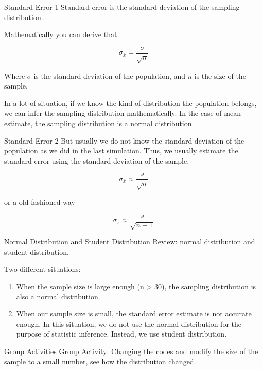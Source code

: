 \documentclass[
  ignorenonframetext,
]{beamer}
\begin{document}
\begin{frame}{Standard Error 1}
\protect\hypertarget{standard-error-1}{}
Standard error is the standard deviation of the sampling distribution.

Mathematically you can derive that

\[\sigma_{\bar{x}} =  \frac{\sigma}{\sqrt{n}}\]

Where \(\sigma\) is the standard deviation of the population, and \(n\)
is the size of the sample.

In a lot of situation, if we know the kind of distribution the
population belongs, we can infer the sampling distribution
mathematically. In the case of mean estimate, the sampling distribution
is a normal distribution.
\end{frame}

\begin{frame}{Standard Error 2}
\protect\hypertarget{standard-error-2}{}
But usually we do not know the standard deviation of the population as
we did in the last simulation. Thus, we usually estimate the standard
error using the standard deviation of the sample.

\[\sigma_{\bar{x}} \approx \frac{s}{\sqrt{n}}\]

or a old fashioned way

\[\sigma_{\bar{x}} \approx \frac{s}{\sqrt{n-1}}\]
\end{frame}

\begin{frame}{Normal Distribution and Student Distribution}
\protect\hypertarget{normal-distribution-and-student-distribution}{}
Review: normal distribution and student distribution.

Two different situations:

\begin{enumerate}
[1)]
\item
  When the sample size is large enough (n \textgreater{} 30), the
  sampling distribution is also a normal distribution.
\item
  When our sample size is small, the standard error estimate is not
  accurate enough. In this situation, we do not use the normal
  distribution for the purpose of statistic inference. Instead, we use
  student distribution.
\end{enumerate}
\end{frame}

\begin{frame}{Group Activities}
\protect\hypertarget{group-activities}{}
Group Activity: Changing the codes and modify the size of the sample to
a small number, see how the distribution changed.
\end{frame}
\end{document}
